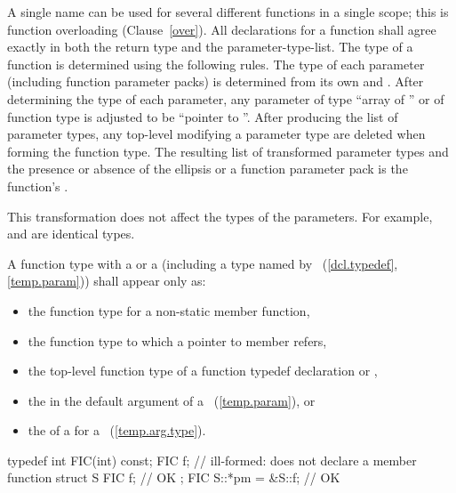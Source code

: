 \pnum
{}%
%
A single name can be used for several different functions in a single scope;
this is function overloading (Clause~\ref{over}).
All declarations for a function shall agree exactly
in both the return type and the parameter-type-list.
The type of a function is determined using the following rules.
The type of each parameter (including function parameter packs) is
determined from its own
and
.
After determining the type of each parameter, any parameter
%
of type ``array of '' or
%
of function type 
is adjusted to be ``pointer to ''.
After producing the list of parameter types,
any top-level
modifying a parameter type are deleted
when forming the function type.
The resulting list of transformed parameter types
and the presence or absence of the ellipsis or a function parameter pack
is the function's
.
\begin{note} This transformation does not affect the types of the parameters.
For example,  and
 are identical types. \end{note}

\pnum
A function type with a  or a
 (including a type named by
~(\ref{dcl.typedef}, \ref{temp.param}))
shall appear only as:
\begin{itemize}
\item the function type for a non-static member function,

\item the function type to which a pointer to member refers,

\item the top-level function type of a function typedef declaration
or ,

\item the  in the default argument of a
~(\ref{temp.param}), or

\item the  of a  for a
~(\ref{temp.arg.type}).
\end{itemize}
\begin{example}

\begin{codeblock}
typedef int FIC(int) const;
FIC f;              // ill-formed: does not declare a member function
struct S {
  FIC f;            // OK
};
FIC S::*pm = &S::f; // OK
\end{codeblock}
\end{example}

